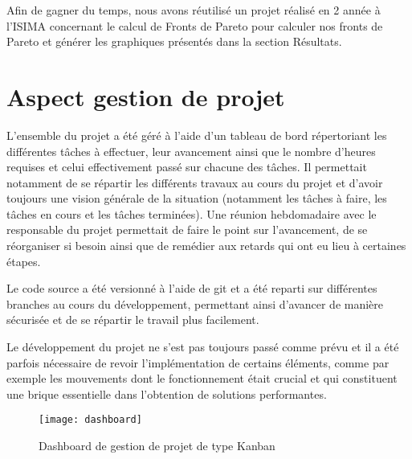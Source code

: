 			Afin de gagner du temps, nous avons réutilisé un projet réalisé en 2\ieme{} année à l'ISIMA concernant le calcul de Fronts de Pareto \cite{projet-zz2} pour calculer nos fronts de Pareto et générer les graphiques présentés dans la section Résultats.

	\section{Aspect gestion de projet}

		L'ensemble du projet a été géré à l'aide d'un tableau de bord répertoriant les différentes tâches à effectuer, leur avancement ainsi que le nombre d'heures requises et celui effectivement passé sur chacune des tâches. Il permettait notamment de se répartir les différents travaux au cours du projet et d'avoir toujours une vision générale de la situation (notamment les tâches à faire, les tâches en cours et les tâches terminées). Une réunion hebdomadaire avec le responsable du projet permettait de faire le point sur l'avancement, de se réorganiser si besoin ainsi que de remédier aux retards qui ont eu lieu à certaines étapes. 
		
		Le code source a été versionné à l'aide de git et a été reparti sur différentes branches au cours du développement, permettant ainsi d'avancer de manière sécurisée et de se répartir le travail plus facilement.
		
		Le développement du projet ne s'est pas toujours passé comme prévu et il a été parfois nécessaire de revoir l'implémentation de certains éléments, comme par exemple les mouvements dont le fonctionnement était crucial et qui constituent une brique essentielle dans l'obtention de solutions performantes.
		

		\begin{figure}[h!]
			\centering
			\texttt{[image: dashboard]}
			\caption{Dashboard de gestion de projet de type Kanban}
			\label{fig:dashboard}
		\end{figure}
